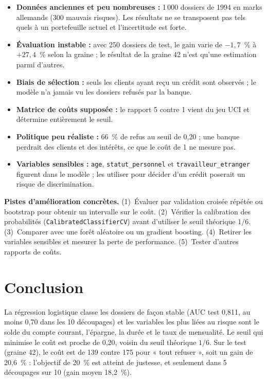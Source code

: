 \documentclass[11pt,a4paper]{article}
\newcommand{\code}[1]{\texttt{\small #1}}
\begin{document}
\begin{itemize}
\item \textbf{Données anciennes et peu nombreuses :} 1\,000 dossiers de 1994 en marks allemands (300 mauvais risques). Les résultats ne se transposent pas tels quels à un portefeuille actuel et l'incertitude est forte.
\item \textbf{Évaluation instable :} avec 250 dossiers de test, le gain varie de $-1{,}7$~\% à $+27{,}4$~\% selon la graine ; le résultat de la graine 42 n'est qu'une estimation parmi d'autres.
\item \textbf{Biais de sélection :} seuls les clients ayant reçu un crédit sont observés ; le modèle n'a jamais vu les dossiers refusés par la banque.
\item \textbf{Matrice de coûts supposée :} le rapport 5 contre 1 vient du jeu UCI et détermine entièrement le seuil.
\item \textbf{Politique peu réaliste :} 66~\% de refus au seuil de 0,20 ; une banque perdrait des clients et des intérêts, ce que le coût de 1 ne mesure pas.
\item \textbf{Variables sensibles :} \code{age}, \code{statut\_personnel} et \code{travailleur\_etranger} figurent dans le modèle ; les utiliser pour décider d'un crédit poserait un risque de discrimination.
\end{itemize}

\textbf{Pistes d'amélioration concrètes.} (1)~Évaluer par validation croisée répétée ou bootstrap pour obtenir un intervalle sur le coût. (2)~Vérifier la calibration des probabilités (\code{CalibratedClassifierCV}) avant d'utiliser le seuil théorique $1/6$. (3)~Comparer avec une forêt aléatoire ou un gradient boosting. (4)~Retirer les variables sensibles et mesurer la perte de performance. (5)~Tester d'autres rapports de coûts.

\section{Conclusion}

La régression logistique classe les dossiers de façon stable (AUC test 0,811, au moins 0,70 dans les 10 découpages) et les variables les plus liées au risque sont le solde du compte courant, l'épargne, la durée et le taux de mensualité. Le seuil qui minimise le coût est proche de 0,20, voisin du seuil théorique $1/6$. Sur le test (graine 42), le coût est de 139 contre 175 pour « tout refuser », soit un gain de 20,6~\% : l'objectif de 20~\% est atteint de justesse, et seulement dans 5 découpages sur 10 (gain moyen 18,2~\%).
\end{document}
